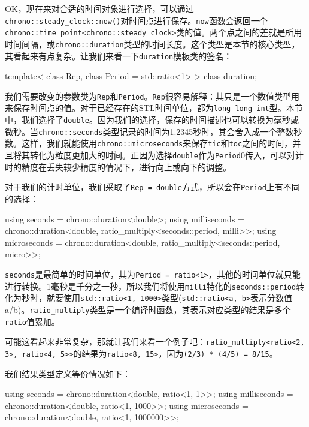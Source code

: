 OK，现在来对合适的时间对象进行选择，可以通过\texttt{chrono::steady\_clock::now()}对时间点进行保存。\texttt{now}函数会返回一个\texttt{chrono::time\_point<chrono::steady\_clock>}类的值。两个点之间的差就是所用时间间隔，或\texttt{chrono::duration}类型的时间长度。这个类型是本节的核心类型，其看起来有点复杂。让我们来看一下\texttt{duration}模板类的签名：

\begin{codebox}[cpp]
template<
    class Rep,
    class Period = std::ratio<1>
> class duration;
\end{codebox}

我们需要改变的参数类为\texttt{Rep}和\texttt{Period}。\texttt{Rep}很容易解释：其只是一个数值类型用来保存时间点的值。对于已经存在的STL时间单位，都为\texttt{long long int}型。本节中，我们选择了\texttt{double}。因为我们的选择，保存的时间描述也可以转换为毫秒或微秒。当\texttt{chrono::seconds}类型记录的时间为1.2345秒时，其会舍入成一个整数秒数。这样，我们就能使用\texttt{chrono::microseconds}来保存\texttt{tic}和\texttt{toc}之间的时间，并且将其转化为粒度更加大的时间。正因为选择\texttt{double}作为\texttt{Period}0传入，可以对计时的精度在丢失较少精度的情况下，进行向上或向下的调整。

对于我们的计时单位，我们采取了\texttt{Rep = double}方式，所以会在\texttt{Period}上有不同的选择：

\begin{codebox}[cpp]
using seconds = chrono::duration<double>;
using milliseconds = chrono::duration<double,
    ratio_multiply<seconds::period, milli>>;
using microseconds = chrono::duration<double,
    ratio_multiply<seconds::period, micro>>;
\end{codebox}

\texttt{seconds}是最简单的时间单位，其为\texttt{Period = ratio<1>}，其他的时间单位就只能进行转换。1毫秒是千分之一秒，所以我们将使用\texttt{milli}特化的\texttt{seconds::period}转化为秒时，就要使用\texttt{std::ratio<1, 1000>}类型(\texttt{std::ratio<a, b>}表示分数值a/b)。\texttt{ratio\_multiply}类型是一个编译时函数，其表示对应类型的结果是多个\texttt{ratio}值累加。

可能这看起来非常复杂，那就让我们来看一个例子吧：\texttt{ratio\_multiply<ratio<2, 3>, ratio<4, 5>>}的结果为\texttt{ratio<8, 15>}，因为\texttt{(2/3) * (4/5) = 8/15}。

我们结果类型定义等价情况如下：

\begin{codebox}[cpp]
using seconds = chrono::duration<double, ratio<1, 1>>;
using milliseconds = chrono::duration<double, ratio<1, 1000>>;
using microseconds = chrono::duration<double, ratio<1, 1000000>>;
\end{codebox}

